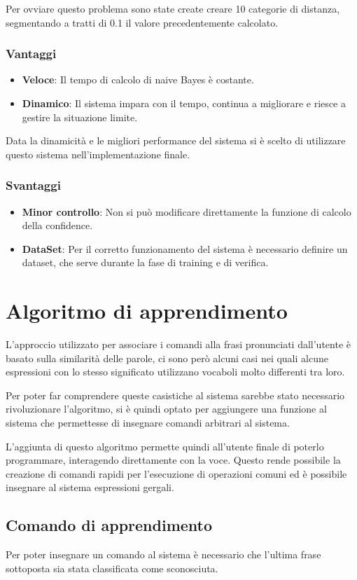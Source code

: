 \documentclass[twoside]{supsistudent}
\begin{document}
Per ovviare questo problema sono state create creare 10 categorie di distanza, segmentando a tratti di 0.1 il valore precedentemente calcolato.
\subsection{Vantaggi}
\begin{itemize}
  \item \textbf{Veloce}: Il tempo di calcolo di naive Bayes è costante.
  \item \textbf{Dinamico}: Il sistema impara con il tempo, continua a migliorare e riesce a gestire la situazione limite.
\end{itemize}
Data la dinamicità e le migliori performance del sistema si è scelto di utilizzare questo sistema nell'implementazione finale.
\subsection{Svantaggi}
\begin{itemize}
  \item \textbf{Minor controllo}: Non si può modificare direttamente la funzione di calcolo della confidence.
  \item \textbf{DataSet}: Per il corretto funzionamento del sistema è necessario definire un dataset, che serve durante la fase di training e di verifica.
\end{itemize}
\chapter{Algoritmo di apprendimento}
L'approccio utilizzato per associare i comandi alla frasi pronunciati dall'utente è basato sulla similarità delle parole, ci sono però alcuni casi nei quali alcune espressioni con lo stesso significato utilizzano vocaboli molto differenti tra loro.

Per poter far comprendere queste casistiche al sistema sarebbe stato necessario rivoluzionare l'algoritmo, si è quindi optato per aggiungere una funzione al sistema che permettesse di insegnare comandi arbitrari al sistema.

L'aggiunta di questo algoritmo permette quindi all'utente finale di poterlo programmare, interagendo direttamente con la voce. Questo rende possibile la creazione di comandi rapidi per l'esecuzione di operazioni comuni ed è possibile insegnare al sistema espressioni gergali.
\section{Comando di apprendimento}
Per poter insegnare un comando al sistema è necessario che l'ultima frase sottoposta sia stata classificata come sconosciuta. 
\end{document}
